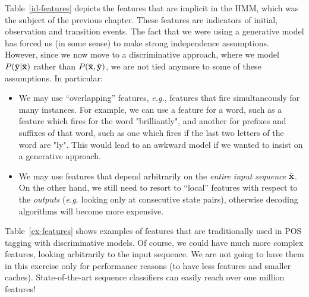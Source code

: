 
Table~\ref{id-features} depicts the features that are implicit in the HMM, which was the subject of 
the previous chapter. These features are indicators of initial, observation and transition events. 
The fact that we were using a generative model has forced us (in some sense) to 
make strong independence assumptions. 
However, since we now move to a discriminative approach, where we model $P(\bar{\mathbf{y}}|\bar{\mathbf{x}})$ rather than $P(\bar{\mathbf{x}},\bar{\mathbf{y}})$, we are not tied anymore to 
some of these assumptions. In particular: 
\begin{itemize}
\item We may use ``overlapping'' features, \emph{e.g.}, features that fire simultaneously for many instances. 
For example, we can use a feature for a word, such as a feature which fires for the word "brilliantly", and another for prefixes and suffixes of that word, such as one which fires if the last two letters of the word are "ly".
This would lead to an awkward model if we wanted to insist on a generative approach. 
\item We may use features that depend arbitrarily on the \emph{entire input sequence} $\bar{\mathbf{x}}$. On the other hand, 
we still need to resort to ``local'' features with respect to the \emph{outputs} (\emph{e.g.} looking only at consecutive state pairs), 
otherwise decoding algorithms will become more expensive.  
\end{itemize}
Table~\ref{ex-features} shows examples of features that are traditionally used in POS tagging with discriminative models.  
Of course, we could have much more complex features, looking arbitrarily to 
the input sequence. We are not going to have them in this
exercise only for performance reasons (to have less features and smaller caches). State-of-the-art sequence classifiers can easily reach over one million features!

